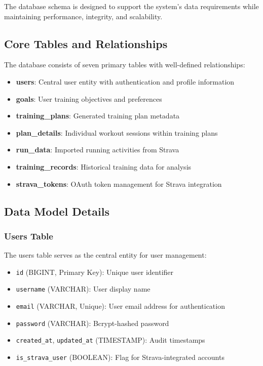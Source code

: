 The database schema is designed to support the system's data requirements while maintaining performance, integrity, and scalability.

\subsection{Core Tables and Relationships}

The database consists of seven primary tables with well-defined relationships:

\begin{itemize}
    \item \textbf{users}: Central user entity with authentication and profile information
    \item \textbf{goals}: User training objectives and preferences
    \item \textbf{training\_plans}: Generated training plan metadata
    \item \textbf{plan\_details}: Individual workout sessions within training plans
    \item \textbf{run\_data}: Imported running activities from Strava
    \item \textbf{training\_records}: Historical training data for analysis
    \item \textbf{strava\_tokens}: OAuth token management for Strava integration
\end{itemize}

\subsection{Data Model Details}

\subsubsection{Users Table}
The users table serves as the central entity for user management:
\begin{itemize}
    \item \texttt{id} (BIGINT, Primary Key): Unique user identifier
    \item \texttt{username} (VARCHAR): User display name
    \item \texttt{email} (VARCHAR, Unique): User email address for authentication
    \item \texttt{password} (VARCHAR): Bcrypt-hashed password
    \item \texttt{created\_at}, \texttt{updated\_at} (TIMESTAMP): Audit timestamps
    \item \texttt{is\_strava\_user} (BOOLEAN): Flag for Strava-integrated accounts
\end{itemize}

